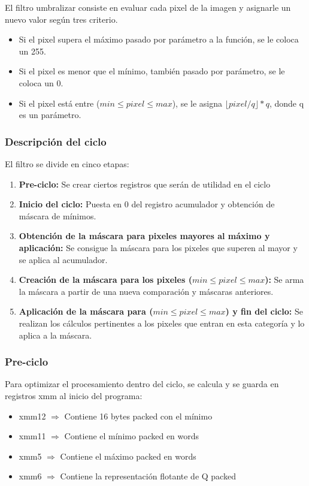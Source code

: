 El filtro umbralizar consiste en evaluar cada pixel de la imagen y asignarle un nuevo valor según tres criterio.
\begin{itemize}
\item Si el pixel supera el máximo pasado por parámetro a la función, se le coloca un 255.
\item Si el pixel es menor que el mínimo, también pasado por parámetro, se le coloca un 0.
\item Si el pixel está entre ($min \leq pixel \leq max$), se le asigna $\lfloor pixel/q \rfloor * q$, donde q es un parámetro.
\end{itemize}

\subsubsection{Descripción del ciclo}
El filtro se divide en cinco etapas:
\begin{enumerate}
\item \textbf{Pre-ciclo:} Se crear ciertos registros que serán de utilidad en el ciclo
\item \textbf{Inicio del ciclo:} Puesta en 0 del registro acumulador y obtención de máscara de mínimos.
\item \textbf{Obtención de la máscara para pixeles mayores al máximo y aplicación:} Se consigue la máscara para los pixeles que superen al mayor y se aplica al acumulador.
\item \textbf{Creación de la máscara para los pixeles ($min \leq pixel \leq max$):} Se arma la máscara a partir de una nueva comparación y máscaras anteriores.
\item \textbf{Aplicación de la máscara para ($min \leq pixel \leq max$) y fin del ciclo:} Se realizan los cálculos pertinentes a los pixeles que entran en esta categoría y lo aplica a la máscara.
\end{enumerate}

\subsubsection{Pre-ciclo}
Para optimizar el procesamiento dentro del ciclo, se calcula y se guarda en registros xmm al inicio del programa:
\begin{itemize}
  \item xmm12 $\Rightarrow$ Contiene 16 bytes packed con el mínimo
  \item xmm11 $\Rightarrow$ Contiene el mínimo packed en words
  \item xmm5 $\Rightarrow$ Contiene el máximo packed en words
  \item xmm6 $\Rightarrow$ Contiene la representación flotante de Q packed
\end{itemize}


